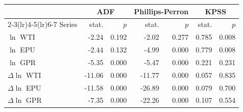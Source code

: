 \begin{tabular}{lrrrrrr}
\toprule
 & \multicolumn{2}{c}{ADF} & \multicolumn{2}{c}{Phillips-Perron} & \multicolumn{2}{c}{KPSS} \\
\cmidrule(lr){2-3}\cmidrule(lr){4-5}\cmidrule(lr){6-7}
Series & stat. & $p$ & stat. & $p$ & stat. & $p$ \\
\midrule
$\ln$ WTI & -2.24 & 0.192 & -2.02 & 0.277 & 0.785 & 0.008 \\
$\ln$ EPU & -2.44 & 0.132 & -4.99 & 0.000 & 0.779 & 0.008 \\
$\ln$ GPR & -5.35 & 0.000 & -5.47 & 0.000 & 0.221 & 0.231 \\
$\Delta\ln$ WTI & -11.06 & 0.000 & -11.77 & 0.000 & 0.057 & 0.835 \\
$\Delta\ln$ EPU & -11.58 & 0.000 & -26.89 & 0.000 & 0.079 & 0.700 \\
$\Delta\ln$ GPR & -7.35 & 0.000 & -22.26 & 0.000 & 0.107 & 0.554 \\
\bottomrule
\end{tabular}
